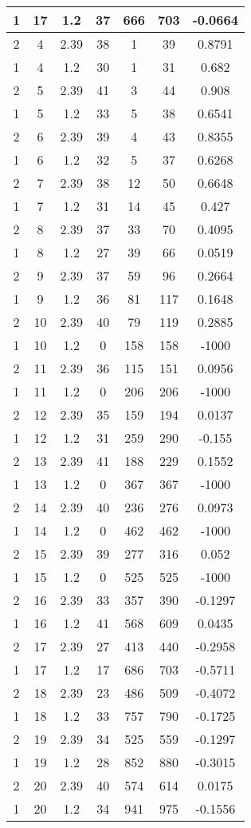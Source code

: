 \documentclass[letterpaper, 12pt]{article}
\begin{document}
\begin{longtable}{|c|c|c|c|c|c|c|}
\hline
1 & 17 & 1.2 & 37 & 666 & 703 & -0.0664 \\
\hline
2 & 4 & 2.39 & 38 & 1 & 39 & 0.8791 \\
\hline
1 & 4 & 1.2 & 30 & 1 & 31 & 0.682 \\
\hline
2 & 5 & 2.39 & 41 & 3 & 44 & 0.908 \\
\hline
1 & 5 & 1.2 & 33 & 5 & 38 & 0.6541 \\
\hline
2 & 6 & 2.39 & 39 & 4 & 43 & 0.8355 \\
\hline
1 & 6 & 1.2 & 32 & 5 & 37 & 0.6268 \\
\hline
2 & 7 & 2.39 & 38 & 12 & 50 & 0.6648 \\
\hline
1 & 7 & 1.2 & 31 & 14 & 45 & 0.427 \\
\hline
2 & 8 & 2.39 & 37 & 33 & 70 & 0.4095 \\
\hline
1 & 8 & 1.2 & 27 & 39 & 66 & 0.0519 \\
\hline
2 & 9 & 2.39 & 37 & 59 & 96 & 0.2664 \\
\hline
1 & 9 & 1.2 & 36 & 81 & 117 & 0.1648 \\
\hline
2 & 10 & 2.39 & 40 & 79 & 119 & 0.2885 \\
\hline
1 & 10 & 1.2 & 0 & 158 & 158 & -1000 \\
\hline
2 & 11 & 2.39 & 36 & 115 & 151 & 0.0956 \\
\hline
1 & 11 & 1.2 & 0 & 206 & 206 & -1000 \\
\hline
2 & 12 & 2.39 & 35 & 159 & 194 & 0.0137 \\
\hline
1 & 12 & 1.2 & 31 & 259 & 290 & -0.155 \\
\hline
2 & 13 & 2.39 & 41 & 188 & 229 & 0.1552 \\
\hline
1 & 13 & 1.2 & 0 & 367 & 367 & -1000 \\
\hline
2 & 14 & 2.39 & 40 & 236 & 276 & 0.0973 \\
\hline
1 & 14 & 1.2 & 0 & 462 & 462 & -1000 \\
\hline
2 & 15 & 2.39 & 39 & 277 & 316 & 0.052 \\
\hline
1 & 15 & 1.2 & 0 & 525 & 525 & -1000 \\
\hline
2 & 16 & 2.39 & 33 & 357 & 390 & -0.1297 \\
\hline
1 & 16 & 1.2 & 41 & 568 & 609 & 0.0435 \\
\hline
2 & 17 & 2.39 & 27 & 413 & 440 & -0.2958 \\
\hline
1 & 17 & 1.2 & 17 & 686 & 703 & -0.5711 \\
\hline
2 & 18 & 2.39 & 23 & 486 & 509 & -0.4072 \\
\hline
1 & 18 & 1.2 & 33 & 757 & 790 & -0.1725 \\
\hline
2 & 19 & 2.39 & 34 & 525 & 559 & -0.1297 \\
\hline
1 & 19 & 1.2 & 28 & 852 & 880 & -0.3015 \\
\hline
2 & 20 & 2.39 & 40 & 574 & 614 & 0.0175 \\
\hline
1 & 20 & 1.2 & 34 & 941 & 975 & -0.1556 \\
\hline
\end{longtable}
\end{document}
